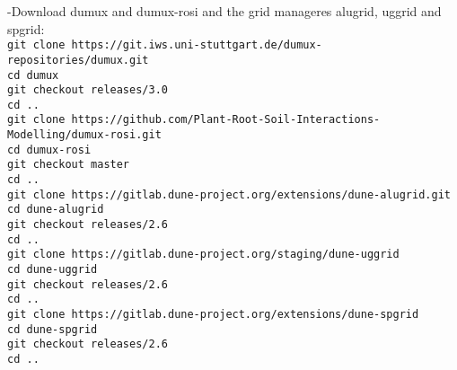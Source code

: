 -Download dumux and dumux-rosi and the grid manageres alugrid, uggrid and spgrid:\\
\texttt{git clone https://git.iws.uni-stuttgart.de/dumux-repositories/dumux.git}\\
    \hspace{\parindent} \texttt{cd dumux}\\
    \hspace{\parindent} \texttt{git checkout releases/3.0}\\
		\hspace{\parindent} \texttt{cd ..}\\
\texttt{git clone https://github.com/Plant-Root-Soil-Interactions-Modelling/dumux-rosi.git}\\
    \hspace{\parindent} \texttt{cd dumux-rosi}\\
    \hspace{\parindent} \texttt{git checkout master}\\
		\hspace{\parindent} \texttt{cd ..}\\
\texttt{git clone https://gitlab.dune-project.org/extensions/dune-alugrid.git}\\
    \hspace{\parindent} \texttt{cd dune-alugrid}\\
    \hspace{\parindent} \texttt{git checkout releases/2.6}\\
		\hspace{\parindent} \texttt{cd ..}\\
\texttt{git clone https://gitlab.dune-project.org/staging/dune-uggrid}\\
    \hspace{\parindent} \texttt{cd dune-uggrid}\\
    \hspace{\parindent} \texttt{git checkout releases/2.6}\\
		\hspace{\parindent} \texttt{cd ..}\\
\texttt{git clone https://gitlab.dune-project.org/extensions/dune-spgrid}\\
    \hspace{\parindent} \texttt{cd dune-spgrid}\\
    \hspace{\parindent} \texttt{git checkout releases/2.6}\\
		\hspace{\parindent} \texttt{cd ..}\\				

